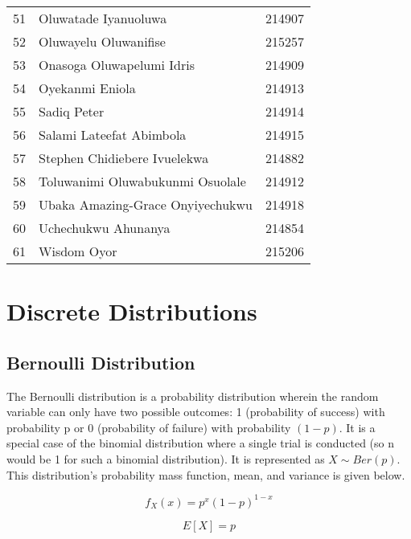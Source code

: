 \documentclass[a4paper]{article}
\begin{document}
\begin{center}
\begin{longtable} { c|l|c }
            51 & Oluwatade Iyanuoluwa & 214907\\
            52 & Oluwayelu Oluwanifise & 215257\\
            53 & Onasoga Oluwapelumi Idris & 214909\\
            54 & Oyekanmi Eniola & 214913\\
            55 & Sadiq Peter & 214914\\
            56 & Salami Lateefat Abimbola & 214915\\
            57 & Stephen Chidiebere Ivuelekwa & 214882\\
            58 & Toluwanimi Oluwabukunmi Osuolale & 214912\\
            59 & Ubaka Amazing-Grace Onyiyechukwu & 214918\\
            60 & Uchechukwu Ahunanya & 214854\\
            61 & Wisdom Oyor & 215206\\
            \bottomrule[4pt]
        \end{longtable}
        \normalsize
    \end{center}

    \newpage

    \section{Discrete Distributions}

    \subsection{Bernoulli Distribution}
    The Bernoulli distribution is a probability distribution wherein the random variable can only have two possible outcomes: 1 (probability of success) with probability p or 0 (probability of failure) with probability $(1 - p)$. It is a special case of the binomial distribution where a single trial is conducted (so n would be 1 for such a binomial distribution). It is represented as $X \sim Ber(p)$. This distribution's probability mass function, mean, and variance is given below.

    \begin{equation}
        \label{eq:bernoulli_pmf}
        f_X(x) = p^{x}{(1-p)}^{1-x}
    \end{equation}

    \begin{equation}
        \label{eq:bernoulli_mean}
        E[X] = p
    \end{equation}
\end{document}
